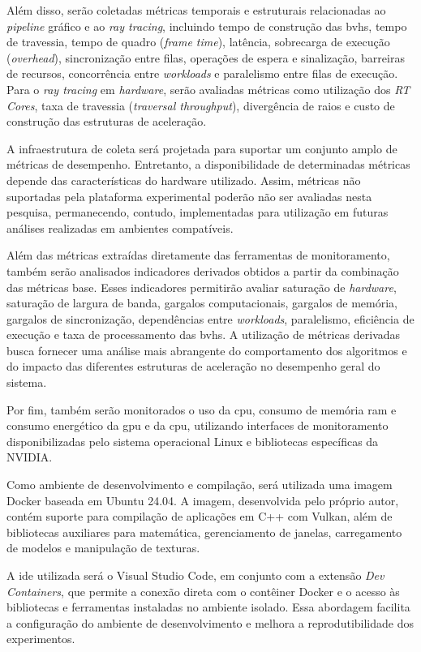 Além disso, serão coletadas métricas temporais e estruturais relacionadas ao \textit{pipeline} gráfico e ao \textit{ray tracing}, incluindo tempo de construção das \glspl{bvh}, tempo de travessia, tempo de quadro (\textit{frame time}), latência, sobrecarga de execução (\textit{overhead}), sincronização entre filas, operações de espera e sinalização, barreiras de recursos, concorrência entre \textit{workloads} e paralelismo entre filas de execução. Para o \textit{ray tracing} em \textit{hardware}, serão avaliadas métricas como utilização dos \textit{RT Cores}, taxa de travessia (\textit{traversal throughput}), divergência de raios e custo de construção das estruturas de aceleração.

A infraestrutura de coleta será projetada para suportar um conjunto amplo de métricas de desempenho. Entretanto, a disponibilidade de determinadas métricas depende das características do hardware utilizado. Assim, métricas não suportadas pela plataforma experimental poderão não ser avaliadas nesta pesquisa, permanecendo, contudo, implementadas para utilização em futuras análises realizadas em ambientes compatíveis.

Além das métricas extraídas diretamente das ferramentas de monitoramento, também serão analisados indicadores derivados obtidos a partir da combinação das métricas base. Esses indicadores permitirão avaliar saturação de \textit{hardware}, saturação de largura de banda, gargalos computacionais, gargalos de memória, gargalos de sincronização, dependências entre \textit{workloads}, paralelismo, eficiência de execução e taxa de processamento das \glspl{bvh}. A utilização de métricas derivadas busca fornecer uma análise mais abrangente do comportamento dos algoritmos e do impacto das diferentes estruturas de aceleração no desempenho geral do sistema.

Por fim, também serão monitorados o uso da \gls{cpu}, consumo de memória \gls{ram} e consumo energético da \gls{gpu} e da \gls{cpu}, utilizando interfaces de monitoramento disponibilizadas pelo sistema operacional Linux e bibliotecas específicas da NVIDIA.

Como ambiente de desenvolvimento e compilação, será utilizada uma imagem Docker baseada em Ubuntu 24.04. A imagem, desenvolvida pelo próprio autor, contém suporte para compilação de aplicações em C++ com Vulkan, além de bibliotecas auxiliares para matemática, gerenciamento de janelas, carregamento de modelos e manipulação de texturas.

A \gls{ide} utilizada será o Visual Studio Code, em conjunto com a extensão \textit{Dev Containers}, que permite a conexão direta com o contêiner Docker e o acesso às bibliotecas e ferramentas instaladas no ambiente isolado. Essa abordagem facilita a configuração do ambiente de desenvolvimento e melhora a reprodutibilidade dos experimentos.

